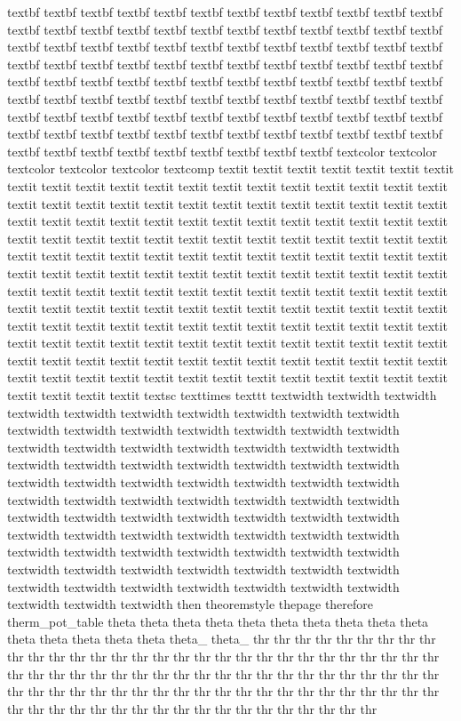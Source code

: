 textbf textbf textbf textbf textbf textbf textbf textbf textbf textbf textbf textbf textbf textbf textbf textbf textbf textbf textbf textbf textbf textbf textbf textbf textbf textbf textbf textbf textbf textbf textbf textbf textbf textbf textbf textbf textbf textbf textbf textbf textbf textbf textbf textbf textbf textbf textbf textbf textbf textbf textbf textbf textbf textbf textbf textbf textbf textbf textbf textbf textbf textbf textbf textbf textbf textbf textbf textbf textbf textbf textbf textbf textbf textbf textbf textbf textbf textbf textbf textbf textbf textbf textbf textbf textbf textbf textbf textbf textbf textbf textbf textbf textbf textbf textbf textbf textbf textbf textbf textbf textbf textbf textbf textbf textbf textcolor textcolor textcolor textcolor textcolor textcomp textit textit textit textit textit textit textit textit textit textit textit textit textit textit textit textit textit textit textit textit textit textit textit textit textit textit textit textit textit textit textit textit textit textit textit textit textit textit textit textit textit textit textit textit textit textit textit textit textit textit textit textit textit textit textit textit textit textit textit textit textit textit textit textit textit textit textit textit textit textit textit textit textit textit textit textit textit textit textit textit textit textit textit textit textit textit textit textit textit textit textit textit textit textit textit textit textit textit textit textit textit textit textit textit textit textit textit textit textit textit textit textit textit textit textit textit textit textit textit textit textit textit textit textit textit textit textit textit textit textit textit textit textit textit textit textit textit textit textit textit textit textit textit textit textit textit textit textit textit textit textit textit textit textit textit textit textit textit textit textit textit textit textit textit textit textit textit textsc texttimes texttt textwidth textwidth textwidth textwidth textwidth textwidth textwidth textwidth textwidth textwidth textwidth textwidth textwidth textwidth textwidth textwidth textwidth textwidth textwidth textwidth textwidth textwidth textwidth textwidth textwidth textwidth textwidth textwidth textwidth textwidth textwidth textwidth textwidth textwidth textwidth textwidth textwidth textwidth textwidth textwidth textwidth textwidth textwidth textwidth textwidth textwidth textwidth textwidth textwidth textwidth textwidth textwidth textwidth textwidth textwidth textwidth textwidth textwidth textwidth textwidth textwidth textwidth textwidth textwidth textwidth textwidth textwidth textwidth textwidth textwidth textwidth textwidth textwidth textwidth textwidth textwidth textwidth textwidth textwidth textwidth textwidth textwidth textwidth then theoremstyle thepage therefore therm_pot_table theta theta theta theta theta theta theta theta theta theta theta theta theta theta theta theta_ theta_ thr thr thr thr thr thr thr thr thr thr thr thr thr thr thr thr thr thr thr thr thr thr thr thr thr thr thr thr thr thr thr thr thr thr thr thr thr thr thr thr thr thr thr thr thr thr thr thr thr thr thr thr thr thr thr thr thr thr thr thr thr thr thr thr thr thr thr thr thr thr thr thr thr thr thr thr thr thr thr thr thr thr thr thr thr thr thr thr thr thr 